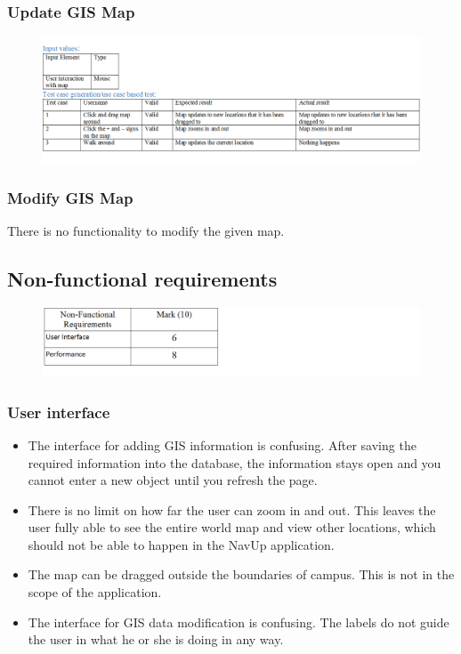 \documentclass[english]{article}
\begin{document}
\subsubsection{Update GIS Map}
\begin{figure}[H]
\hspace*{-2.5cm}
\includegraphics[width=180mm]{UpdateGISMap.png}
\end{figure}
\subsubsection{Modify GIS Map}
There is no functionality to modify the given map.
\subsection{Non-functional requirements}
\begin{figure}[H]
\hspace*{-2.5cm}
\includegraphics[width=180mm]{NFRMarks.png}
\end{figure}
\subsubsection{User interface}
\begin{itemize}
\item	The interface for adding GIS information is confusing. After saving the required information into the database, the information stays open and you cannot enter a new object until you refresh the page.\\
\item	There is no limit on how far the user can zoom in and out. This leaves the user fully able to see the entire world map and view other locations, which should not be able to happen in the NavUp application.\\
\item	The map can be dragged outside the boundaries of campus. This is not in the scope of the application.\\
\item	The interface for GIS data modification is confusing. The labels do not guide the user in what he or she is doing in any way.\\
  \end{itemize}
\end{document}
